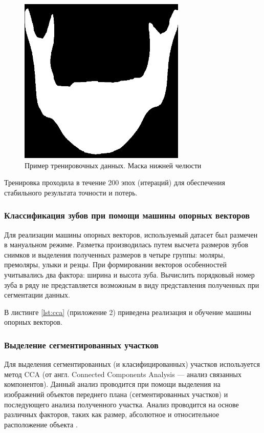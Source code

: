 \begin{figure}[H]
	\centering
	\includegraphics[width=300px]{img/mandible.png}
	\caption{Пример тренировочных данных. Маска нижней челюсти}
	\label{fig:mandible}
\end{figure}

Тренировка проходила в течение 200 эпох (итераций) для обеспечения стабильного результата точности и потерь.

\subsubsection{Классификация зубов при помощи машины опорных векторов}

Для реализации машины опорных векторов, используемый датасет был размечен в мануальном режиме. Разметка производилась путем высчета размеров зубов снимков и выделения полученных размеров в четыре группы: моляры, премоляры, улыки и резцы. При формировании векторов особенностей учитывались два фактора: ширина и высота зуба. Вычислить порядковый номер зуба в ряду не представляется возможным в виду представления полученных при сегментации данных.

В листинге \ref{lst:cca} (приложение 2)  приведена реализация и обучение машины опорных векторов.

\subsubsection{Выделение сегментированных участков}

Для выделения сегментированных (и класифицированных) участков используется метод CCA (от англ. Connected Components Analysis --- анализ связанных компонентов). Данный анализ проводится при помощи выделения на изображений объектов переднего плана (сегментированных участков) и последующего анализа полученного участка. Анализ проводится на основе различных факторов, таких как размер, абсолютное и относительное расположение объекта \cite{cca}.

